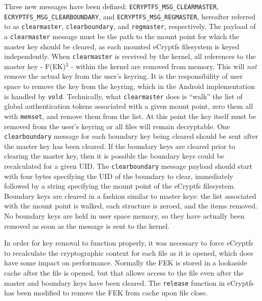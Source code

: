 Three new messages have been defined: \texttt{ECRYPTFS\_MSG\_CLEARMASTER}, \texttt{ECRYPTFS\_MSG\_CLEARBOUNDARY}, and
\texttt{ECRYPTFS\_MSG\_REGMASTER}, hereafter referred to as \texttt{clearmaster}, \texttt{clearboundary}, and \texttt{regmaster},
respectively. The payload of a \texttt{clearmaster} message must be the path to the mount point for which the master key should be
cleared, as each mounted eCryptfs filesystem is keyed independently. When \texttt{clearmaster} is received by the kernel, all
references to the master key - F(EK)$^{3}$ - within the kernel are removed from memory. This will \emph{not} remove the
actual key from the user's keyring. It is the responsibility of user space to remove the key from the keyring, which in the Android
implementation is handled by \texttt{vold}.  Technically, what \texttt{clearmaster} does is ``walk'' the list of global
authentication tokens associated with a given mount point, zero them all with \texttt{memset}, and remove them from the list.  At
this point the key itself must be removed from the user's keyring or all files will remain decryptable. One \texttt{clearboundary}
message for each boundary key being cleared should be sent after the master key has been cleared. If the boundary keys are cleared
prior to clearing the master key, then it is possible the boundary keys could be recalculated for a given UID. The
\texttt{clearboundary} message payload should start with four bytes specifying the UID of the boundary to clear, immediately
followed by a string specifying the mount point of the eCryptfs filesystem. Boundary keys are cleared in a fashion similar to master
keys: the list associated with the mount point is walked, each structure is zeroed, and the items removed.  No boundary keys are
held in user space memory, so they have actually been removed as soon as the message is sent to the kernel. 

In order for key removal to function properly, it was necessary to force eCryptfs to recalculate the cryptographic context for
each file as it is opened, which does have some impact on performance. Normally the FEK is stored in a lookaside cache after the
file is opened, but that allows access to the file even after the master and boundary keys have been cleared. The \texttt{release}
function in eCryptfs has been modified to remove the FEK from cache upon file close.


